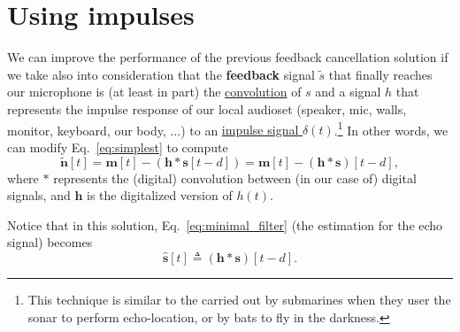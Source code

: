 \section{Using impulses}
We can improve the performance of the previous feedback cancellation
solution if we take also into consideration that the \textbf{feedback}
signal $\tilde{s}$ that finally reaches our microphone is (at least in
part) the
\href{https://en.wikipedia.org/wiki/Convolution}{convolution} of
$s$ and a signal $h$ that represents the impulse response of our
local audioset (speaker, mic, walls, monitor, keyboard, our body, ...)
to an \href{https://en.wikipedia.org/wiki/Impulse_response}{impulse
  signal $\delta(t)$}.\footnote{This technique is similar to the
  carried out by submarines when they user the sonar to perform
  echo-location, or by bats to fly in the darkness.} In other words,
we can modify Eq.~\eqref{eq:simplest} to compute
\begin{equation}
 \tilde{\mathbf{n}}[t] = \mathbf{m}[t] - (\mathbf{h}\ast\mathbf{s}[t-d]) = \mathbf{m}[t] - (\mathbf{h}\ast\mathbf{s})[t-d],
  \label{eq:using_convolution}
\end{equation}
where $\ast$ represents the (digital) convolution between (in our case
of) digital signals, and ${\mathbf h}$ is the digitalized version of
$h(t)$.

Notice that in this solution, Eq.~\eqref{eq:minimal_filter} (the
estimation for the echo signal) becomes
\begin{equation}
  \hat{\mathbf s}[t] \triangleq (\mathbf{h}\ast\mathbf{s})[t-d].
  \label{eq:echo_signal_modeled_by_FIR}
\end{equation}

